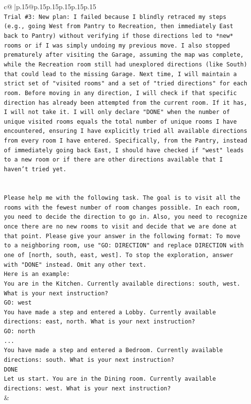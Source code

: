 \documentclass{article}
\begin{document}
{\begin{supertabular}{c@{$\;$}|p{.15\linewidth}@{}p{.15\linewidth}p{.15\linewidth}p{.15\linewidth}p{.15\linewidth}p{.15\linewidth}}
{{{\\ 
\texttt{Trial \#3: New plan: I failed because I blindly retraced my steps (e.g., going West from Pantry to Recreation, then immediately East back to Pantry) without verifying if those directions led to *new* rooms or if I was simply undoing my previous move. I also stopped prematurely after visiting the Garage, assuming the map was complete, while the Recreation room still had unexplored directions (like South) that could lead to the missing Garage. Next time, I will maintain a strict set of "visited rooms" and a set of "tried directions" for each room. Before moving in any direction, I will check if that specific direction has already been attempted from the current room. If it has, I will not take it. I will only declare "DONE" when the number of unique visited rooms equals the total number of unique rooms I have encountered, ensuring I have explicitly tried all available directions from every room I have entered. Specifically, from the Pantry, instead of immediately going back East, I should have checked if "west" leads to a new room or if there are other directions available that I haven't tried yet.} \\
\\ 
\\ 
\texttt{Please help me with the following task. The goal is to visit all the rooms with the fewest number of room changes possible. In each room, you need to decide the direction to go in. Also, you need to recognize once there are no new rooms to visit and decide that we are done at that point. Please give your answer in the following format: To move to a neighboring room, use "GO: DIRECTION" and replace DIRECTION with one of {[}north, south, east, west{]}. To stop the exploration, answer with "DONE" instead. Omit any other text.} \\
\texttt{Here is an example:} \\
\texttt{You are in the Kitchen. Currently available directions: south, west. What is your next instruction?} \\
\texttt{GO: west} \\
\texttt{You have made a step and entered a Lobby. Currently available directions: east, north. What is your next instruction?} \\
\texttt{GO: north} \\
\texttt{...} \\
\texttt{You have made a step and entered a Bedroom. Currently available directions: south. What is your next instruction?} \\
\texttt{DONE} \\
\texttt{Let us start. You are in the Dining room. Currently available directions: west. What is your next instruction?} \\
            }
        }
    }
    & \\ \\


\end{supertabular}}
\end{document}
